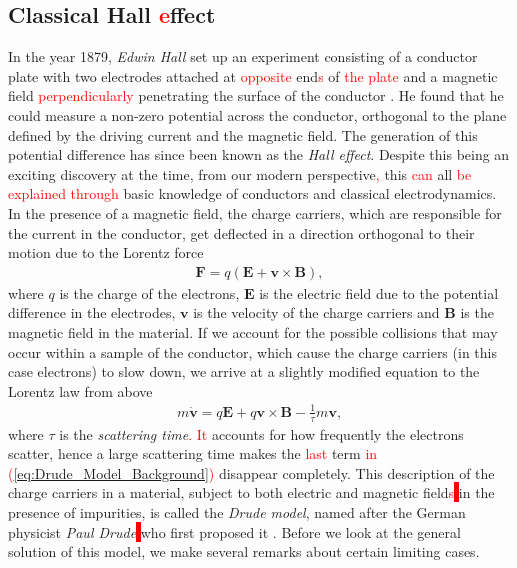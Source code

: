         \subsection{Classical Hall \textcolor{red}{e}ffect}
        In the year 1879, \textit{Edwin Hall} \cite{Hall1879} set up an experiment consisting of a conductor plate with two electrodes attached at \textcolor{red}{opposite} end\textcolor{red}{s} of \textcolor{red}{the plate} \colorbox{red}{ } and a magnetic field \textcolor{red}{perpendicularly} penetrating the surface of the conductor \colorbox{red}{ }. He found that he could measure a non-zero potential across the conductor, orthogonal to the plane defined by the driving current and the magnetic field. The generation of this potential difference has since been known as the \textit{Hall effect}. Despite this being an exciting discovery at the time, from our modern perspective\textcolor{red}{,} this \textcolor{red}{can} all \textcolor{red}{be explained through} basic knowledge of conductors and classical electrodynamics. In the presence of a magnetic field, the charge carriers, which are responsible for the current in the conductor, get deflected in a direction orthogonal to their motion due to the Lorentz force
        \begin{align}
            { \bm F} = q(\bm{E} + \bm{v}\times \bm{B}),
        \end{align}
        where $q$ is the charge of the electrons, $\bm{E}$ is the electric field due to the potential difference in the electrodes, $\bm{v}$ is the velocity of the charge carriers and $\bm{B}$ is the magnetic field in the material. If we \colorbox{red}{ } account for the possible collisions that may occur within a sample of the conductor, which \colorbox{red}{ } cause the charge carriers (in this case electrons) to slow down, we \colorbox{red}{ } arrive at a slightly modified equation to the Lorentz law from above
        \begin{align}
            m \dot{\bm{v}} = q \bm{E}+q \bm{v}\times \bm{B} - \frac{1}{\tau} m \bm{v}, \label{eq:Drude_Model_Background}
        \end{align}
        where $\tau$ is the \textit{scattering time}\textcolor{red}{. It} accounts for how frequently the electrons scatter, hence a large scattering time makes the \textcolor{red}{last} term \textcolor{red}{in (\ref{eq:Drude_Model_Background})} disappear completely. This description of the charge carriers in a material, subject to both electric and magnetic field\textcolor{red}{s}\colorbox{red}{ } in the presence of impurities, is called the \textit{Drude model}, named after the German physicist \textit{Paul Drude}\colorbox{red}{ }  who first proposed it \cite{Drude1900a, Drude1900b}. Before we look at the general solution of this model, we make several remarks about certain limiting cases.\\
